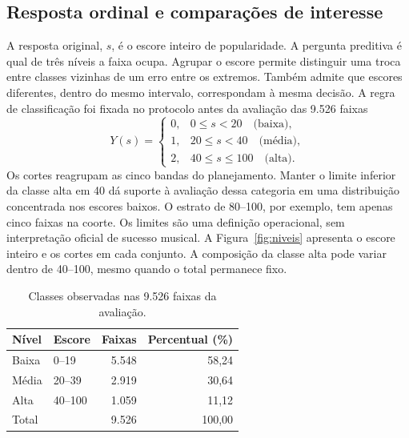 \subsection{Resposta ordinal e comparações de interesse}
A resposta original, $s$, é o escore inteiro de popularidade. A pergunta preditiva é qual de três níveis a faixa ocupa. Agrupar o escore permite distinguir uma troca entre classes vizinhas de um erro entre os extremos. Também admite que escores diferentes, dentro do mesmo intervalo, correspondam à mesma decisão. A regra de classificação foi fixada no protocolo antes da avaliação das 9.526 faixas
\begin{equation}
Y(s)=
\begin{cases}
0, & 0\leq s<20 \quad \text{(baixa)},\\
1, & 20\leq s<40 \quad \text{(média)},\\
2, & 40\leq s\leq 100 \quad \text{(alta)}.
\end{cases}
\end{equation}
Os cortes reagrupam as cinco bandas do planejamento. Manter o limite inferior da classe alta em 40 dá suporte à avaliação dessa categoria em uma distribuição concentrada nos escores baixos. O estrato de 80--100, por exemplo, tem apenas cinco faixas na coorte. Os limites são uma definição operacional, sem interpretação oficial de sucesso musical. A Figura~\ref{fig:niveis} apresenta o escore inteiro e os cortes em cada conjunto. A composição da classe alta pode variar dentro de 40--100, mesmo quando o total permanece fixo.


\begin{table}[H]\centering\small
\caption{Classes observadas nas 9.526 faixas da avaliação.}\label{tab:niveis}
\begin{tabular}{llrr}\toprule
Nível & Escore & Faixas & Percentual (\%) \\\midrule
Baixa & 0--19 & 5.548 & 58,24 \\
Média & 20--39 & 2.919 & 30,64 \\
Alta & 40--100 & 1.059 & 11,12 \\\midrule
Total &  & 9.526 & 100,00 \\\bottomrule
\end{tabular}
\end{table}

